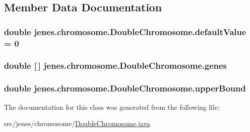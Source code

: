 \subsection{Member Data Documentation}
\hypertarget{classjenes_1_1chromosome_1_1_double_chromosome_a5c2d56f7d05b08c75013a7529ae46839}{
\subsubsection[{default\-Value}]{\setlength{\rightskip}{0pt plus 5cm}double jenes.\-chromosome.\-Double\-Chromosome.\-default\-Value = 0\hspace{0.3cm}{\ttfamily [protected]}}}\label{classjenes_1_1chromosome_1_1_double_chromosome_a5c2d56f7d05b08c75013a7529ae46839}
\hypertarget{classjenes_1_1chromosome_1_1_double_chromosome_a0a987b7f1fa1c4cec652330ad77b6ba6}{
\subsubsection[{genes}]{\setlength{\rightskip}{0pt plus 5cm}double \mbox{[}$\,$\mbox{]} jenes.\-chromosome.\-Double\-Chromosome.\-genes\hspace{0.3cm}{\ttfamily [protected]}}}\label{classjenes_1_1chromosome_1_1_double_chromosome_a0a987b7f1fa1c4cec652330ad77b6ba6}
\hypertarget{classjenes_1_1chromosome_1_1_double_chromosome_a56362107033b220e75d83b75ea91b74e}{
\subsubsection[{upper\-Bound}]{\setlength{\rightskip}{0pt plus 5cm}double jenes.\-chromosome.\-Double\-Chromosome.\-upper\-Bound\hspace{0.3cm}{\ttfamily [protected]}}}\label{classjenes_1_1chromosome_1_1_double_chromosome_a56362107033b220e75d83b75ea91b74e}


The documentation for this class was generated from the following file\-:\begin{DoxyCompactItemize}
\item 
src/jenes/chromosome/\hyperlink{_double_chromosome_8java}{Double\-Chromosome.\-java}\end{DoxyCompactItemize}

